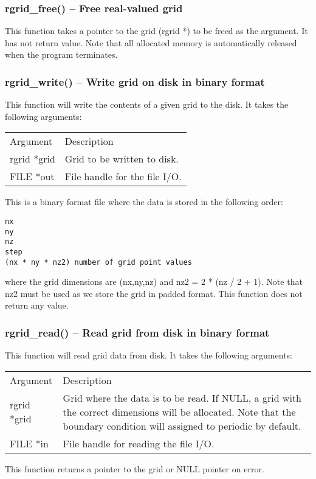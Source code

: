 \documentclass[12pt,letterpaper]{article}
\begin{document}
\subsubsection{rgrid\_free() -- Free real-valued grid}

This function takes a pointer to the grid (rgrid *) to be freed as the argument. It has not return value. Note that all allocated memory is automatically released when the program terminates.

\subsubsection{rgrid\_write() -- Write grid on disk in binary format}

This function will write the contents of a given grid to the disk. It takes the following arguments:
\begin{longtable}{p{} p{}}
Argument & Description\\
\cline{1-2}
rgrid *grid & Grid to be written to disk.\\
FILE *out & File handle for the file I/O.\\
\end{longtable}
\noindent
This is a binary format file where the data is stored in the following order:
\begin{verbatim}
nx
ny
nz
step
(nx * ny * nz2) number of grid point values
\end{verbatim}
where the grid dimensions are (nx,ny,nz) and nz2 = 2 * (nz / 2 + 1). Note that nz2 must be used as we store the grid in padded format. This function does not return any value.

\subsubsection{rgrid\_read() -- Read grid from disk in binary format}

This function will read grid data from disk. It takes the following arguments:
\begin{longtable}{p{} p{}}
Argument & Description\\
\cline{1-2}
rgrid *grid & Grid where the data is to be read. If NULL, a grid with the correct dimensions will be allocated. Note that the boundary condition will assigned to periodic by default.\\
FILE *in & File handle for reading the file I/O.\\
\end{longtable}
This function returns a pointer to the grid or NULL pointer on error.
\end{document}
